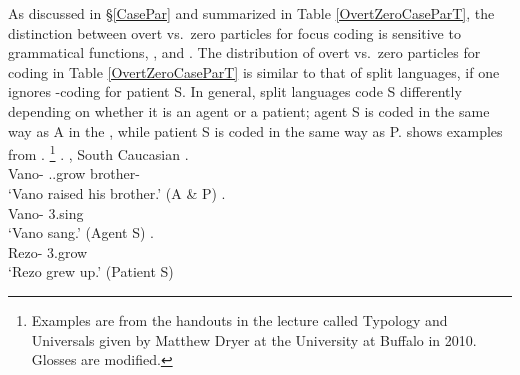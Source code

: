 As discussed in \S \ref{CasePar} and summarized in Table \ref{OvertZeroCaseParT},
the distinction between overt vs.\ zero particles for focus coding is sensitive to grammatical functions, , and .
The distribution of overt vs.\ zero particles for  coding in Table \ref{OvertZeroCaseParT}
is similar to that of split  languages,
if one ignores -coding for patient S.
In general, split  languages code S differently
depending on whether it is an agent or a patient;
agent S is coded in the same way as A in the ,
while patient S is coded in the same way as P.
\Next shows examples from .%
	\footnote{
	Examples are from the handouts in the lecture called Typology and Universals given by Matthew Dryer at the University at Buffalo in 2010.
	Glosses are modified.
	}
\ex. , South Caucasian
	\ag.    \\
		Vano- \ab{3}..grow brother- \\
		`Vano raised his brother.' \hfill{(A \& P)}
	\bg.   \\
		Vano- 3.sing \\
		`Vano sang.' \hfill{(Agent S)}
	\bg.   \\
		Rezo- 3.grow \\
		`Rezo grew up.' \hfill{(Patient S)}
%

